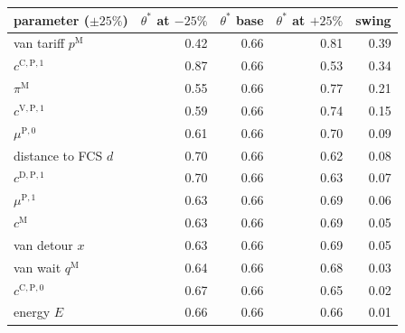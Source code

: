 \begin{tabular}{lrrrr}\toprule
parameter ($\pm25\%$) & $\theta^{*}$ at $-25\%$ & $\theta^{*}$ base & $\theta^{*}$ at $+25\%$ & swing \\ \midrule
van tariff $p^{\mathrm{M}}$ & 0.42 & 0.66 & 0.81 & 0.39 \\
$c^{\mathrm{C},\mathrm{P},1}$ & 0.87 & 0.66 & 0.53 & 0.34 \\
$\pi^{\mathrm{M}}$ & 0.55 & 0.66 & 0.77 & 0.21 \\
$c^{\mathrm{V},\mathrm{P},1}$ & 0.59 & 0.66 & 0.74 & 0.15 \\
$\mu^{\mathrm{P},0}$ & 0.61 & 0.66 & 0.70 & 0.09 \\
distance to FCS $d$ & 0.70 & 0.66 & 0.62 & 0.08 \\
$c^{\mathrm{D},\mathrm{P},1}$ & 0.70 & 0.66 & 0.63 & 0.07 \\
$\mu^{\mathrm{P},1}$ & 0.63 & 0.66 & 0.69 & 0.06 \\
$c^{\mathrm{M}}$ & 0.63 & 0.66 & 0.69 & 0.05 \\
van detour $x$ & 0.63 & 0.66 & 0.69 & 0.05 \\
van wait $q^{\mathrm{M}}$ & 0.64 & 0.66 & 0.68 & 0.03 \\
$c^{\mathrm{C},\mathrm{P},0}$ & 0.67 & 0.66 & 0.65 & 0.02 \\
energy $E$ & 0.66 & 0.66 & 0.66 & 0.01 \\
\bottomrule\end{tabular}
